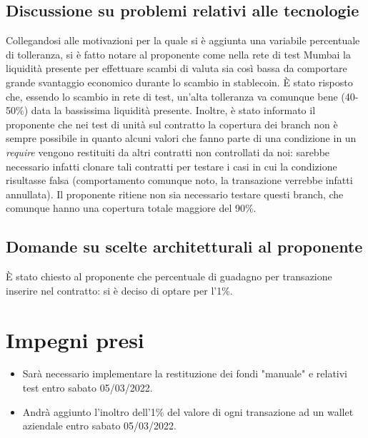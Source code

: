 \documentclass[a4paper, 12pt]{article}
\begin{document}
\subsection{Discussione su problemi relativi alle tecnologie}
Collegandosi alle motivazioni per la quale si è aggiunta una variabile percentuale di tolleranza, si è fatto notare al proponente come nella rete di test Mumbai la liquidità presente per effettuare scambi di valuta sia così bassa da comportare grande svantaggio economico durante lo scambio in stablecoin.
È stato risposto che, essendo lo scambio in rete di test, un'alta tolleranza va comunque bene (40-50\%) data la bassissima liquidità presente.
Inoltre, è stato informato il proponente che nei test di unità sul contratto la copertura dei branch non è sempre possibile in quanto alcuni valori
che fanno parte di una condizione in un \textit{require} vengono restituiti da altri contratti non controllati da noi: sarebbe necessario infatti clonare tali contratti per testare i casi in cui
la condizione risultasse falsa (comportamento comunque noto, la transazione verrebbe infatti annullata).
Il proponente ritiene non sia necessario testare questi branch, che comunque hanno una copertura totale maggiore del 90\%.

\subsection{Domande su scelte architetturali al proponente}
È stato chiesto al proponente che percentuale di guadagno per transazione inserire nel contratto: si è deciso di optare per l'1\%.


\section{Impegni presi}
\begin{itemize}
\item Sarà necessario implementare la restituzione dei fondi "manuale" e relativi test entro sabato 05/03/2022.
\item Andrà aggiunto l'inoltro dell'1\% del valore di ogni transazione ad un wallet aziendale entro sabato 05/03/2022.
\end{itemize}
\end{document}
